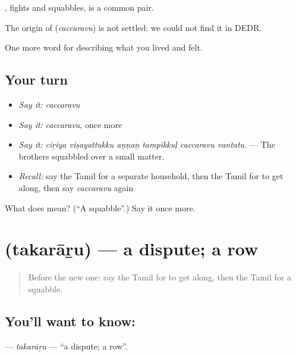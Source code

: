  , fights and squabbles, is a common pair.

\begin{cousinweb}
The origin of \textbf{} (\emph{caccaravu}) is not settled; we could not find it in DEDR.
\end{cousinweb}

\begin{grammarlens}[title={What you've built}]
One more word for describing what you lived and felt.
\end{grammarlens}

\subsection*{Your turn}
\begin{itemize}
\raggedright
  \item \emph{Say it:} \emph{caccaravu}
  \item \emph{Say it:} \emph{caccaravu}, once more
  \item \emph{Say it:} \emph{ciṟiya viṣayattukku aṇṇaṉ tampikkuḷ caccaravu vantatu.} — The brothers squabbled over a small matter.
  \item \emph{Recall:} say the Tamil for a separate household, then the Tamil for to get along, then say \emph{caccaravu} again
\end{itemize}

\begin{tcolorbox}[breakable,colback=teal!4,colframe=teal!35!black,title={Before you move on}]
What does  mean? (\textquotedblleft{}A squabble\textquotedblright{}.) Say it once more.
\end{tcolorbox}
\section[\texorpdfstring{\ta{தகராறு} (takarāṟu)}{தகராறு (takarāṟu)}]{ (takarāṟu) — a dispute; a row}

\label{lesson:TA-C501-takararu}



\begin{quote}
Before the new one: say the Tamil for to get along, then the Tamil for a squabble.
\end{quote}

\subsection*{You'll want to know: }
\textbf{} — \emph{takarāṟu} — \textquotedblleft{}a dispute; a row\textquotedblright{}.

